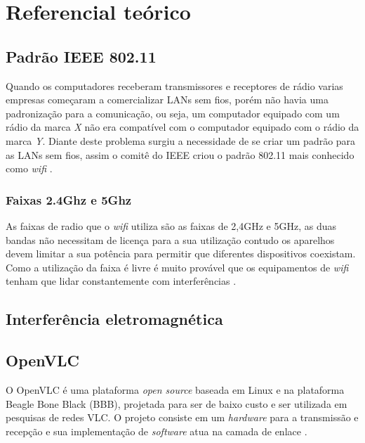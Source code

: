 \section{Referencial teórico}  

\subsection{Padrão IEEE 802.11}

Quando os computadores receberam transmissores e receptores de rádio varias empresas começaram a comercializar LANs sem fios, porém não havia uma padronização para a comunicação, ou seja, um computador equipado com um rádio da marca \emph{X} não era compatível com o computador equipado com o rádio da marca \emph{Y}. Diante deste problema surgiu a necessidade de se criar um padrão para as LANs sem fios, assim o comitê do IEEE criou o padrão 802.11 mais conhecido como \textit{wifi} \cite{tanenbaum}.

\subsubsection{Faixas 2.4Ghz e 5Ghz}

As faixas de radio que o \textit{wifi} utiliza são as faixas de 2,4GHz e 5GHz, as duas bandas não necessitam de licença para a sua utilização contudo os aparelhos devem limitar a sua potência para permitir que diferentes dispositivos coexistam. Como a utilização da faixa é livre é muito provável que os equipamentos de \textit{wifi} tenham que lidar constantemente com interferências \cite{tanenbaum}.

\subsection{Interferência eletromagnética}

\subsection{OpenVLC}

O OpenVLC é uma plataforma \textit{open source} baseada em  Linux e na plataforma Beagle Bone Black (BBB), projetada para ser de baixo custo e ser utilizada em pesquisas de redes VLC. O projeto consiste em um \textit{hardware} para a transmissão e recepção e sua implementação de \textit{software} atua na camada de enlace \cite{OpenVLCB}.

